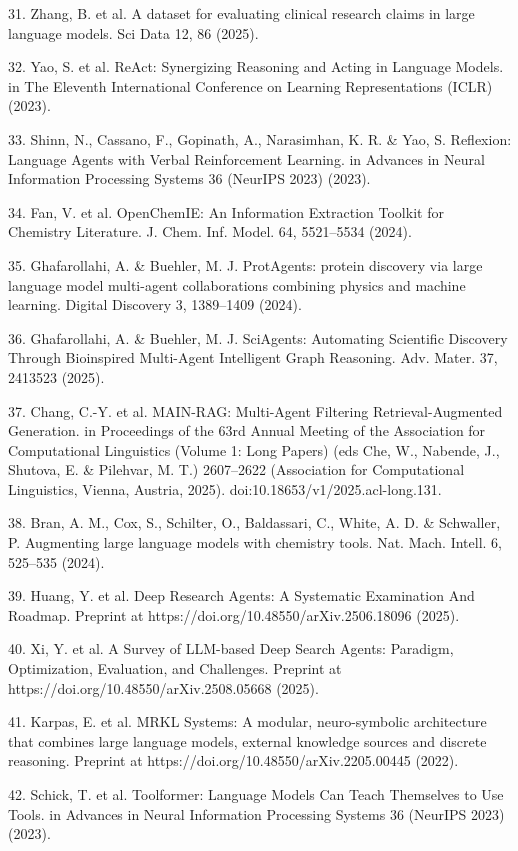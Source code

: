 \documentclass[
]{article}
\begin{document}
31. Zhang, B. et al. A dataset for evaluating clinical research claims
in large language models. Sci Data 12, 86 (2025).

32. Yao, S. et al. ReAct: Synergizing Reasoning and Acting in Language
Models. in The Eleventh International Conference on Learning
Representations (ICLR) (2023).

33. Shinn, N., Cassano, F., Gopinath, A., Narasimhan, K. R. \& Yao, S.
Reflexion: Language Agents with Verbal Reinforcement Learning. in
Advances in Neural Information Processing Systems 36 (NeurIPS 2023)
(2023).

34. Fan, V. et al. OpenChemIE: An Information Extraction Toolkit for
Chemistry Literature. J. Chem. Inf. Model. 64, 5521--5534 (2024).

35. Ghafarollahi, A. \& Buehler, M. J. ProtAgents: protein discovery via
large language model multi-agent collaborations combining physics and
machine learning. Digital Discovery 3, 1389--1409 (2024).

36. Ghafarollahi, A. \& Buehler, M. J. SciAgents: Automating Scientific
Discovery Through Bioinspired Multi-Agent Intelligent Graph Reasoning.
Adv. Mater. 37, 2413523 (2025).

37. Chang, C.-Y. et al. MAIN-RAG: Multi-Agent Filtering
Retrieval-Augmented Generation. in Proceedings of the 63rd Annual
Meeting of the Association for Computational Linguistics (Volume 1: Long
Papers) (eds Che, W., Nabende, J., Shutova, E. \& Pilehvar, M. T.)
2607--2622 (Association for Computational Linguistics, Vienna, Austria,
2025). doi:10.18653/v1/2025.acl-long.131.

38. Bran, A. M., Cox, S., Schilter, O., Baldassari, C., White, A. D. \&
Schwaller, P. Augmenting large language models with chemistry tools.
Nat. Mach. Intell. 6, 525--535 (2024).

39. Huang, Y. et al. Deep Research Agents: A Systematic Examination And
Roadmap. Preprint at https://doi.org/10.48550/arXiv.2506.18096 (2025).

40. Xi, Y. et al. A Survey of LLM-based Deep Search Agents: Paradigm,
Optimization, Evaluation, and Challenges. Preprint at
https://doi.org/10.48550/arXiv.2508.05668 (2025).

41. Karpas, E. et al. MRKL Systems: A modular, neuro-symbolic
architecture that combines large language models, external knowledge
sources and discrete reasoning. Preprint at
https://doi.org/10.48550/arXiv.2205.00445 (2022).

42. Schick, T. et al. Toolformer: Language Models Can Teach Themselves
to Use Tools. in Advances in Neural Information Processing Systems 36
(NeurIPS 2023) (2023).
\end{document}
